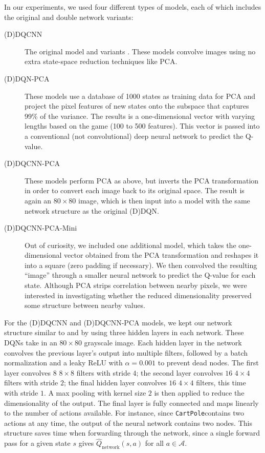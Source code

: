 \documentclass[11pt]{article}
\newcommand{\cp}{\texttt{CartPole}}
\begin{document}
In our experiments, we used four different types of models, each of which includes the original and double network variants: 

\begin{description}
    \item[(D)DQCNN] The original model \cite{mnih2013playing, mnih2015human} and variants \cite{van2016deep}. These models convolve images using no extra state-space reduction techniques like PCA.
    
    \item[(D)DQN-PCA] These models use a database of 1000 states as training data for PCA and project the pixel features of new states onto the subspace that captures 99\% of the variance. The results is a one-dimensional vector with varying lengths based on the game (100 to 500 features). This vector is passed into a conventional (not convolutional) deep neural network to predict the Q-value.
    
    \item[(D)DQCNN-PCA] These models perform PCA as above, but inverts the PCA transformation in order to convert each image back to its original space. The result is again an $80 \times 80$ image, which is then input into a model with the same network structure as the original (D)DQN.
    
    \item[(D)DQCNN-PCA-Mini] Out of curiosity, we included one additional model, which takes the one-dimensional vector obtained from the PCA transformation and reshapes it into a square (zero padding if necessary). We then convolved the resulting ``image'' through a smaller neural network to predict the Q-value for each state. Although PCA strips correlation between nearby pixels, we were interested in investigating whether the reduced dimensionality preserved some structure between nearby values.
\end{description}

For the (D)DQCNN and (D)DQCNN-PCA models, we kept our network structure similar to \cite{mnih2013playing} and \cite{mnih2015human} by using three hidden layers in each network. These DQNs take in an $80 \times 80$ grayscale image. Each hidden layer in the network convolves the previous layer's output into multiple filters, followed by a batch normalization and a leaky ReLU with $\alpha = 0.001$ to prevent dead nodes. The first layer convolves $8$ $8 \times 8$ filters with stride $4$; the second layer convolves $16$ $4 \times 4$ filters with stride $2$; the final hidden layer convolves $16$ $4 \times 4$ filters, this time with stride $1$. A max pooling with kernel size $2$ is then applied to reduce the dimensionality of the output. The final layer is fully connected and maps linearly to the number of actions available. For instance, since \cp contains two actions at any time, the output of the neural network contains two nodes. This structure saves time when forwarding through the network, since a single forward pass for a given state $s$ gives $\hat{Q}_\text{network}(s, a)$ for all $a \in \mathcal{A}$.
\end{document}

